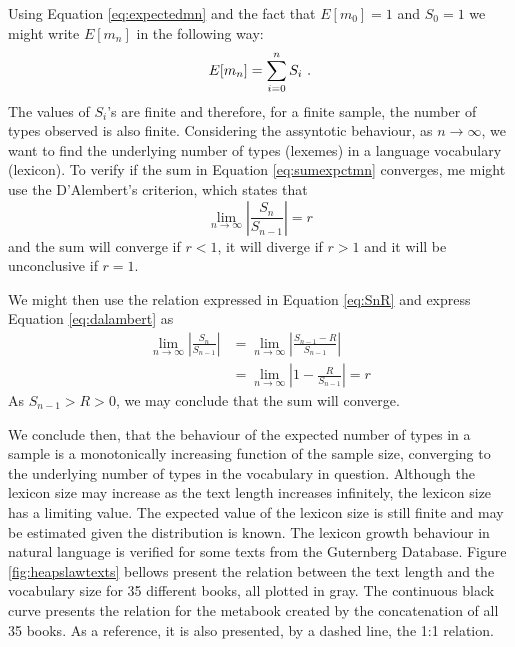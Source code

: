 Using Equation \ref{eq:expectedmn} and the fact that $E[m_0]=1$ and $S_0=1$ we might write
$E[m_n]$ in the following way:
\begin{equation}
\label{eq:sumexpctmn}
E[m_n] = \sum_{i=0}^n S_i \textmd{ .}
\end{equation}
The values of $S_i$'s are finite and therefore, for a finite sample, the number of types
observed is also finite. Considering the assyntotic behaviour, as $n \rightarrow \infty$,
we want to find the underlying number of types (lexemes) in a language vocabulary (lexicon).
To verify if the sum in Equation \ref{eq:sumexpctmn} converges, me might use the D'Alembert's criterion,
which states that
\begin{equation}
\label{eq:dalambert}
\lim_{n \to \infty} \left| \frac{S_n}{S_{n-1}} \right| = r
\end{equation}
and the sum will converge if $r <1$, it will diverge if $r > 1$ and it will be unconclusive
if $r=1$. 

We might then use the relation expressed in Equation \ref{eq:SnR} and express Equation
\ref{eq:dalambert} as
\begin{align}
\lim_{n \to \infty} \left| \frac{S_n}{S_{n-1}} \right| &= \lim_{n \to \infty} \left| \frac{S_{n-1} - R}{S_{n-1}} \right| \nonumber \\
       &= \lim_{n \to \infty} \left| 1 - \frac{R}{S_{n-1}} \right| = r
\end{align}
As $S_{n-1} > R > 0$, we may conclude that the sum will converge. 

We conclude then, that 
the behaviour of the expected number of types in a sample is a monotonically increasing
function of the sample size, converging to the underlying number of types in the vocabulary 
in question. Although the lexicon size may increase as the text length 
increases infinitely, the lexicon size has a limiting value.
The expected value of the lexicon size is still finite and may be estimated given 
the distribution is known.
The lexicon growth behaviour in natural language is verified for some texts from the Guternberg 
Database. Figure \ref{fig:heapslawtexts} bellows present the relation between the text length and
the vocabulary size for 35 different books, all plotted in gray. The continuous black curve
presents the relation for the metabook created by the concatenation of all 35 books. As a reference,
it is also presented, by a dashed line, the 1:1 relation.
 


